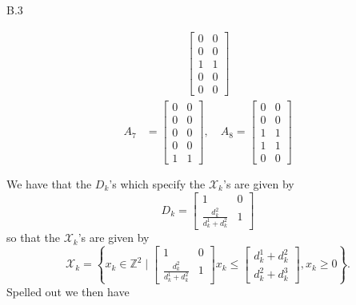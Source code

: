 \documentclass[a4paper]{article}
\begin{document}
\begin{exercise}{B.3}
\begin{enumerate}[label=(\roman*)]
\begin{align*}
\begin{bmatrix}
                0 & 0 \\
                0 & 0 \\
                1 & 1 \\
                0 & 0 \\
                0 & 0
              \end{bmatrix}
      \end{align*}
      \begin{align*}
        A_7 &= \begin{bmatrix}
          0 & 0 \\
          0 & 0 \\
          0 & 0 \\
          0 & 0 \\
          1 & 1
          \end{bmatrix},\quad A_8 = \begin{bmatrix}
          0 & 0 \\
          0 & 0 \\
          1 & 1 \\
          1 & 1 \\
          0 & 0
        \end{bmatrix} \\ \\
        \end{align*}
        We have that the $ D_k $'s which specify the $ \mathscr{X}_k $'s are given by
        \begin{equation*}
          D_k = \begin{bmatrix}
            1 & 0 \\
            \frac{d_k^{2}}{d_k^1 + d_k^2} & 1
          \end{bmatrix}
        \end{equation*}
        so that the $ \mathscr{X}_k $'s are given by
        \begin{equation*}
          \mathscr{X}_k = \left\{ x_k \in \mathbb{Z}^2 \mid \begin{bmatrix}
              1 & 0 \\
              \frac{d_k^2}{d_k^1 + d_k^2} & 1
          \end{bmatrix}x_k \leq \begin{bmatrix}
              d_k^1 + d_k^2 \\
              d_k^{2} + d_k^{3}
          \end{bmatrix}, x_k \geq 0 \right\}
        .\end{equation*}
        Spelled out we then have

\end{enumerate}
\end{exercise}
\end{document}
